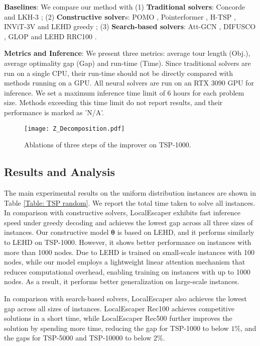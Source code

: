 \textbf{Baselines}: We compare our method with (1) \textbf{Traditional solvers}: Concorde \cite{applegate2009certification} and LKH-3 \cite{helsgaun2017extension}; (2) \textbf{Constructive solver}s: POMO \cite{kwon2020pomo}, Pointerformer \cite{jin2023pointerformer}, H-TSP \cite{pan2023h}, INViT-3V\cite{fang2024invit} and LEHD greedy \cite{luo2023neural}; (3) \textbf{Search-based solvers}: Att-GCN \cite{fu2021generalize}, DIFUSCO \cite{sun2023difusco}, GLOP \cite{ye2024glop} and LEHD RRC100 \cite{luo2023neural}. 

\textbf{Metrics and Inference}: 
We present three metrics: average tour length (Obj.), average optimality gap (Gap) and run-time (Time). 
Since traditional solvers are run on a single CPU, their run-time should not be directly compared with methods running on a GPU. 
All neural solvers are run on an RTX 3090 GPU for inference. We set a maximum inference time limit of 6 hours for each problem size. Methods exceeding this time limit do not report results, and their performance is marked as 'N/A'. 



\begin{figure}[t]
\centering
\texttt{[image: Z\_Decomposition.pdf]}
\caption{Ablations of three steps of the improver
on TSP-1000.}
\label{fig:Decomposition}
\end{figure}

\subsection{Results and Analysis}
The main experimental results on the uniform distribution instances are shown in Table \ref{Table: TSP random}. 
We report the total time taken to solve all instances. 
In comparison with constructive solvers, LocalEscaper exhibits fast inference speed under greedy decoding and achieves the lowest gap across all three sizes of instances. Our constructive model $\boldsymbol{\theta}$ is based on LEHD, and it performs similarly to LEHD on TSP-1000. However, it shows better performance on instances with more than 1000 nodes. Due to LEHD is trained on small-scale instances with 100 nodes, while our model employs a lightweight linear attention mechanism that reduces computational overhead, enabling training on instances with up to 1000 nodes. As a result, it performs better  generalization on large-scale instances. 

In comparison with search-based solvers, LocalEscaper also achieves the lowest gap across all sizes of instances. LocalEscaper Rec100 achieves competitive solutions in a short time, while LocalEscaper Rec500 further improves the solution by spending more time, reducing the gap for TSP-1000 to below $1\%$, and the gaps for TSP-5000 and TSP-10000 to below $2\%$. 


